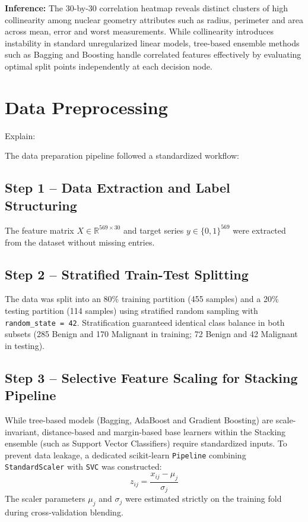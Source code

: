 \documentclass[12pt,a4paper]{article}
\begin{document}
\textbf{Inference:}
The 30-by-30 correlation heatmap reveals distinct clusters of high collinearity among nuclear geometry attributes such as radius, perimeter and area across mean, error and worst measurements. While collinearity introduces instability in standard unregularized linear models, tree-based ensemble methods such as Bagging and Boosting handle correlated features effectively by evaluating optimal split points independently at each decision node.

\section{Data Preprocessing}

Explain:

The data preparation pipeline followed a standardized workflow:

\subsection*{Step 1 -- Data Extraction and Label Structuring}
The feature matrix $X \in \mathbb{R}^{569 \times 30}$ and target series $y \in \{0, 1\}^{569}$ were extracted from the dataset without missing entries.

\subsection*{Step 2 -- Stratified Train-Test Splitting}
The data was split into an 80\% training partition (455 samples) and a 20\% testing partition (114 samples) using stratified random sampling with \texttt{random\_state = 42}. Stratification guaranteed identical class balance in both subsets (285 Benign and 170 Malignant in training; 72 Benign and 42 Malignant in testing).

\subsection*{Step 3 -- Selective Feature Scaling for Stacking Pipeline}
While tree-based models (Bagging, AdaBoost and Gradient Boosting) are scale-invariant, distance-based and margin-based base learners within the Stacking ensemble (such as Support Vector Classifiers) require standardized inputs. To prevent data leakage, a dedicated scikit-learn \texttt{Pipeline} combining \texttt{StandardScaler} with \texttt{SVC} was constructed:
\begin{equation}
z_{ij} = \frac{x_{ij} - \mu_j}{\sigma_j}
\end{equation}
The scaler parameters $\mu_j$ and $\sigma_j$ were estimated strictly on the training fold during cross-validation blending.
\end{document}
